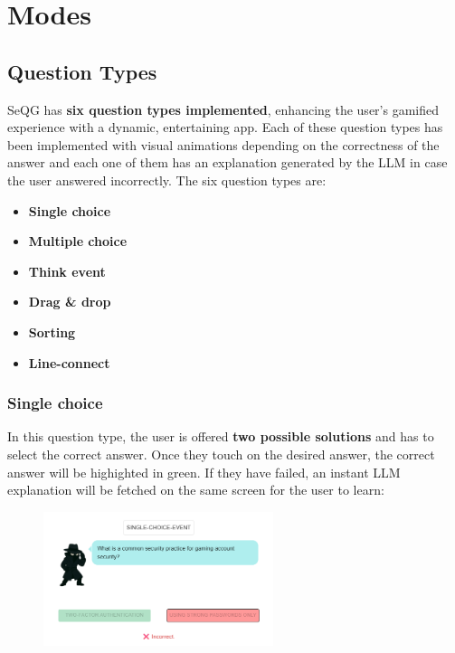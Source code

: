 \section{Modes}

\subsection{Question Types}
SeQG has \textbf{six question types implemented}, enhancing the user's gamified experience with a dynamic, entertaining
app. Each of these question types has been implemented with visual animations depending on the correctness of
the answer and each one of them has an explanation generated by the LLM in case the user answered incorrectly.
The six question types are:
\begin{itemize}
    \item \textbf{Single choice} 
    \item \textbf{Multiple choice} 
    \item \textbf{Think event} 
    \item \textbf{Drag \& drop}
    \item \textbf{Sorting}
    \item \textbf{Line-connect}
\end{itemize}

\subsubsection{Single choice}
In this question type, the user is offered \textbf{two possible solutions} and has to select the correct answer. Once they
touch on the desired answer, the correct answer will be highighted in green. If they have failed, an instant LLM explanation
will be fetched on the same screen for the user to learn:
\begin{figure}[htbp]
    \centering
    \includegraphics[width=0.6\textwidth]{images/Single_Choice.png}
\end{figure}

